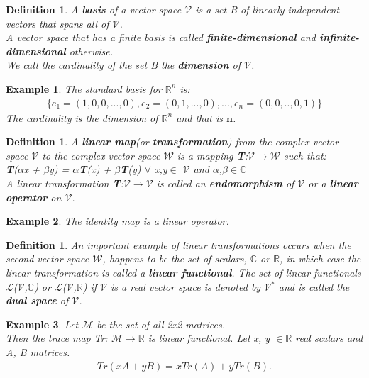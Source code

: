 \documentclass[12pt,a4paper]{article}
\newtheorem{defn}[thm]{Definition}
\newtheorem{exmp}{Example}[section]
\begin{document}
\begin{defn}
A \textbf{basis} of a vector space $\mathcal{V}$ is a set B of linearly independent vectors that spans all of $\mathcal{V}$. \\A vector space that has a finite basis is called \textbf{finite-dimensional} and \textbf{infinite-dimensional} otherwise. \\We call the cardinality of the set B the \textbf{dimension} of $\mathcal{V}$.
\end{defn}
\begin{exmp}
The standard basis for $\mathbb{R}^n$ is:
\begin{align*}
\{ e_1 = (1, 0, 0, ... , 0), e_2 = (0, 1, ... , 0), ... , e_n=(0,0,..,0, 1) \}
\end{align*}
The cardinality is the dimension of $\mathbb{R}^n$ and that is $\textbf{n}$.
\end{exmp}
\begin{defn}
A \textbf{linear map}(or \textbf{transformation}) from the complex vector space $\mathcal{V}$ to the complex vector space $\mathcal{W}$ is a mapping \textbf{T}:$\mathcal{V}$$\to$$\mathcal{W}$ such that:\\
\hspace{1cm} \textbf{T}($\alpha$x + $\beta$y) = $\alpha$\textbf{T}(x) + $\beta$\textbf{T}(y) $\forall$ x,y$\in$ $\mathcal{V}$ and $\alpha$,$\beta$$\in$$\mathbb{C}$\\
A linear transformation \textbf{T}:$\mathcal{V}$$\to$$\mathcal{V}$ is called an \textbf{endomorphism} of $\mathcal{V}$ or a \textbf{linear operator} on $\mathcal{V}$.
\end{defn}
\begin{exmp}
The identity map is a linear operator.
\end{exmp}
\begin{defn}
An important example of linear transformations occurs when the second vector space $\mathcal{W}$, happens to be the set of scalars, $\mathbb{C}$ or $\mathbb{R}$, in which case the linear transformation is called a \textbf{linear functional}. The set of linear functionals $\mathcal{L}$($\mathcal{V}$,$\mathbb{C}$) or $\mathcal{L}$($\mathcal{V}$,$\mathbb{R}$) if $\mathcal{V}$ is a real vector space is denoted by $\mathcal{V}$$^*$ and is called the \textbf{dual space} of $\mathcal{V}$.
\end{defn}
\begin{exmp}
Let $\mathcal{M}$ be the set of all 2x2 matrices.\\
Then the trace map Tr: $\mathcal{M} \to \mathbb{R}$ is linear functional. Let x, y $\in \mathbb{R}$ real scalars and A, B matrices.
\begin{align*}
Tr(xA + yB) = xTr(A) + yTr(B).
\end{align*}
\end{exmp}
\end{document}
